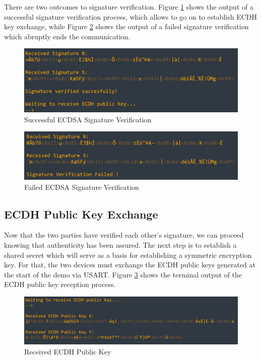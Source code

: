    There are two outcomes to signature verification. Figure \ref{fig:verif out} shows the output of a successful signature verification process, which allows to go on to establish ECDH key exchange, while Figure \ref{fig:ecdsa verif fail} shows the output of a failed signature verification which abruptly ends the communication. 
   
   \begin{figure}[H]
    \centering
    \includegraphics[width=18cm]{img/verif out.png}
    \caption{Successful ECDSA Signature Verification}
    \label{fig:verif out}
    \end{figure}
    
    \begin{figure}[H]
    \centering
    \includegraphics[width=18cm]{img/verif fail.png}
    \caption{Failed ECDSA Signature Verification}
    \label{fig:ecdsa verif fail}
    \end{figure}

    \subsection{ECDH Public Key Exchange}
    Now that the two parties have verified each other's signature, we can proceed knowing that authenticity has been assured. The next step is to establish a shared secret which will serve as a basis for establishing a symmetric encryption key. For that, the two devices must exchange the ECDH public keys generated at the start of the demo via USART. Figure \ref{fig:ecdh_pub} shows the terminal output of the ECDH public key reception process.
    
    \begin{figure}[H]
    \centering
    \includegraphics[width=17cm]{img/received ecdh pub.png}
    \caption{Received ECDH Public Key}
    \label{fig:ecdh_pub}
    \end{figure}
    
